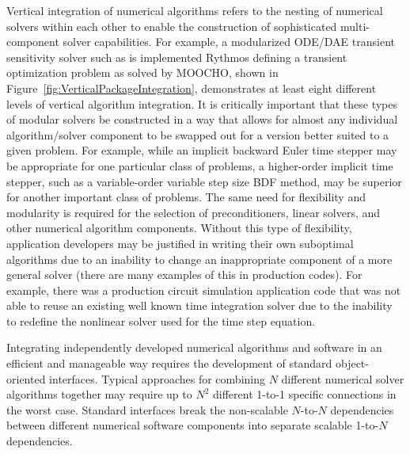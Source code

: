 \documentclass[pdf,ps2pdf,11pt]{SANDreport}
\begin{document}
Vertical integration of numerical algorithms refers to the nesting of
numerical solvers within each other to enable the construction of
sophisticated multi-component solver capabilities.  For example, a modularized
ODE/DAE transient sensitivity solver such as is implemented Rythmos defining
a transient optimization problem as solved by MOOCHO, shown in
Figure~\ref{fig:VerticalPackageIntegration}, demonstrates at least eight
different levels of vertical algorithm integration.  It is critically
important that these types of modular solvers be constructed in a way that
allows for almost any individual algorithm/solver component to be swapped out
for a version better suited to a given problem.  For example, while an
implicit backward Euler time stepper may be appropriate for one particular
class of problems, a higher-order implicit time stepper, such as a
variable-order variable step size BDF method, may be superior for another
important class of problems.  The same need for flexibility and modularity is
required for the selection of preconditioners, linear solvers, and other
numerical algorithm components.  Without this type of flexibility, application
developers may be justified in writing their own suboptimal algorithms due to
an inability to change an inappropriate component of a more general solver
(there are many examples of this in production codes).  For example, there was
a production circuit simulation application code that was not able to reuse an
existing well known time integration solver due to the inability to redefine
the nonlinear solver used for the time step equation.



Integrating independently developed numerical algorithms and software in an
efficient and manageable way requires the development of standard
object-oriented interfaces.  Typical approaches for combining $N$ different
numerical solver algorithms together may require up to $N^2$ different 1-to-1
specific connections in the worst case.  Standard interfaces break the
non-scalable $N$-to-$N$ dependencies between different numerical software
components into separate scalable 1-to-$N$ dependencies.

\end{document}
